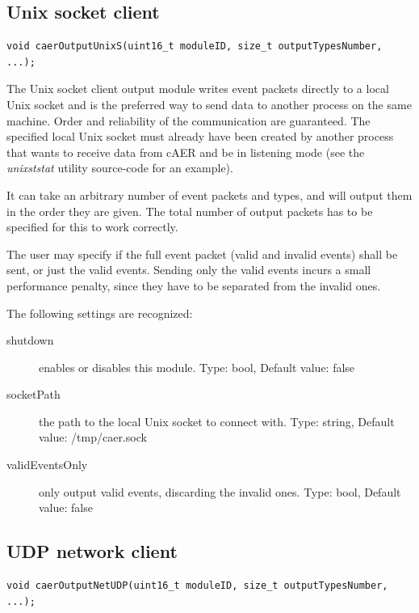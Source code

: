 \documentclass[a4paper,12pt]{report}
\begin{document}
\subsection{Unix socket client} \label{subsec:unix_socket_client}

\begin{lstlisting}
void caerOutputUnixS(uint16_t moduleID, size_t outputTypesNumber, ...);
\end{lstlisting}

The Unix socket client output module writes event packets directly to a local Unix socket and is the preferred way to send data to another process on the same machine. Order and reliability of the communication are guaranteed.
The specified local Unix socket must already have been created by another process that wants to receive data from cAER and be in listening mode (see the \emph{unixststat} utility source-code for an example).

It can take an arbitrary number of event packets and types, and will output them in the order they are given. The total number of output packets has to be specified for this to work correctly.

The user may specify if the full event packet (valid and invalid events) shall be sent, or just the valid events. Sending only the valid events incurs a small performance penalty, since they have to be separated from the invalid ones.

The following settings are recognized:
\begin{description}
\item[shutdown] enables or disables this module.
\subitem Type: bool, Default value: false
\item[socketPath] the path to the local Unix socket to connect with.
\subitem Type: string, Default value: /tmp/caer.sock
\item[validEventsOnly] only output valid events, discarding the invalid ones.
\subitem Type: bool, Default value: false
\end{description}
\clearpage
\subsection{UDP network client} \label{subsec:udp_network_client}

\begin{lstlisting}
void caerOutputNetUDP(uint16_t moduleID, size_t outputTypesNumber, ...);
\end{lstlisting}
\end{document}
